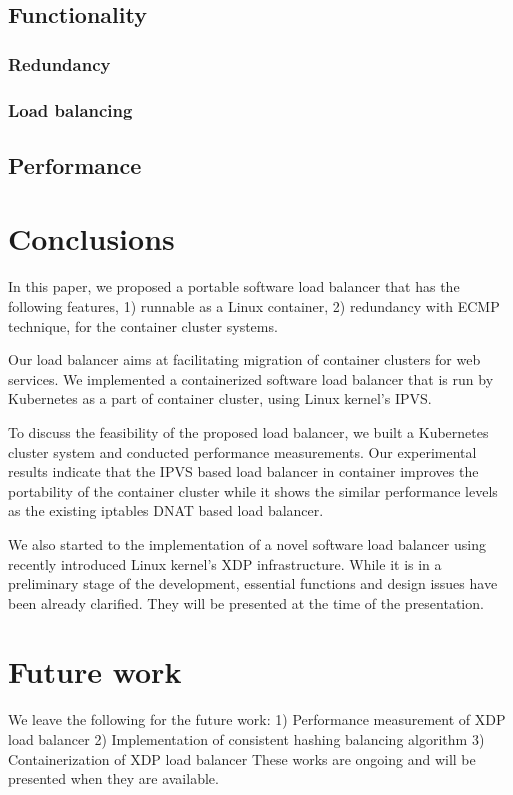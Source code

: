 \subsection{Functionality}\label{Functionality}

\subsubsection{Redundancy}

\subsubsection{Load balancing}

\subsection{Performance}\label{Performance}



\section{Conclusions}\label{Conclusions}

In this paper, we proposed a portable software load balancer that has the following features, 1) runnable as a Linux container, 2) redundancy with ECMP technique,  for the container cluster systems.

Our load balancer aims at facilitating migration of container clusters for web services.
We implemented a containerized software load balancer that is run by Kubernetes as a part of container cluster,
using Linux kernel's IPVS.

To discuss the feasibility of the proposed load balancer, we built
a Kubernetes cluster system and conducted performance measurements.
Our experimental results indicate that the IPVS based load balancer in container improves the portability of
the container cluster while it shows the similar performance levels as the existing iptables DNAT based load balancer.

We also started to the implementation of a novel software load balancer using recently introduced Linux kernel's XDP infrastructure.
While it is in a preliminary stage of the development, essential functions and design issues have been already clarified.
They will be presented at the time of the presentation.

\section{Future work}\label{Future work}

We leave the following for the future work:
1) Performance measurement of XDP load balancer
2) Implementation of consistent hashing balancing algorithm
3) Containerization of XDP load balancer
These works are ongoing and will be presented when they are available.

